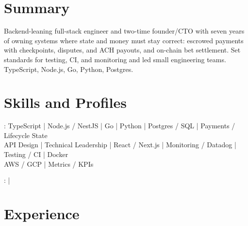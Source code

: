 \documentclass[print]{jack-resume}
\begin{document}
\pagecolor{darkmodeBackground}


\begin{minipage}[t][1cm][t]{.03\textwidth}
    \hfill
\end{minipage}

\section{Summary}
Backend-leaning full-stack engineer and two-time founder/CTO with seven years of owning systems where state and money must stay correct: escrowed payments with checkpoints, disputes, and ACH payouts, and on-chain bet settlement. Set standards for testing, CI, and monitoring and led small engineering teams. TypeScript, Node.js, Go, Python, Postgres.
\sectionsep

\section{Skills and Profiles}
:
TypeScript \hfill | \hfill
Node.js / NestJS \hfill | \hfill
Go \hfill | \hfill
Python \hfill | \hfill
Postgres / SQL \hfill | \hfill
Payments / Lifecycle State \\
\hspace{1.0cm} API Design \hfill | \hfill
Technical Leadership \hfill | \hfill
React / Next.js \hfill | \hfill
Monitoring / Datadog \hfill | \hfill
Testing / CI \hfill | \hfill
Docker \\
\hspace{1.0cm} AWS / GCP \hfill | \hfill
Metrics / KPIs \\

\raggedright{
    :
      \href{https://www.linkedin.com/in/jack-sturtevant/}{ \ExternalLink} |
     \href{https://github.com/jacksturt}{ \ExternalLink}}

\section{Experience}
\end{document}
